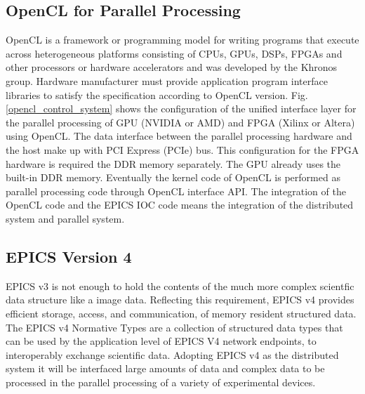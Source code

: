 \documentclass[journal]{IEEEtran}
\begin{document}
\subsection{OpenCL for Parallel Processing}
OpenCL\cite{opencl_wiki} is a framework or programming model for writing programs that execute across heterogeneous platforms consisting of CPUs, GPUs, DSPs, FPGAs and other processors or hardware accelerators and was developed by the Khronos group. 
Hardware manufacturer must provide application program interface libraries to satisfy the specification according to OpenCL version. Fig.\ref{opencl_control_system} shows the configuration of the unified interface layer for the parallel processing of GPU (NVIDIA or AMD) and FPGA (Xilinx or Altera) using OpenCL. The data interface between the parallel processing hardware and the host make up with PCI Express (PCIe) bus. This configuration for the FPGA hardware is required the DDR memory separately. The GPU already uses the built-in DDR memory. Eventually the kernel code of OpenCL is performed as parallel processing code through OpenCL interface API. The integration of the OpenCL code and the EPICS IOC code means the integration of the distributed system and parallel system.
\subsection{EPICS Version 4}
EPICS v3 is not enough to hold the contents of the much more complex scientfic data structure like a image data.
Reflecting this requirement, EPICS v4\cite{epics_v4} provides efficient storage, access, and communication, of memory resident structured data. The EPICS v4 Normative Types\cite{epics_v4_normative} are a collection of structured data types that can be used by the application level of EPICS V4 network endpoints, to interoperably exchange scientific data. Adopting EPICS v4 as the distributed system it will be interfaced large amounts of data and complex data to be processed in the parallel processing of a variety of experimental devices.
\end{document}
